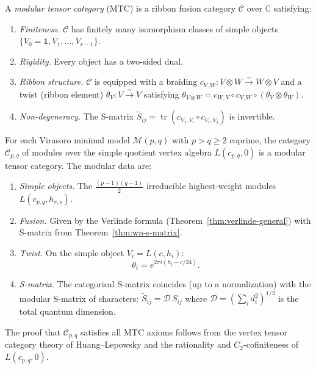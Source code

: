 \begin{definition}\label{def:modular-tensor-category}
A \emph{modular tensor category} (MTC) is a ribbon fusion category $\mathcal{C}$
over $\mathbb{C}$ satisfying:
\begin{enumerate}
\item \emph{Finiteness.}  $\mathcal{C}$ has finitely many isomorphism classes of simple
objects $\{V_0 = \mathbb{1}, V_1, \ldots, V_{r-1}\}$.
\item \emph{Rigidity.}  Every object has a two-sided dual.
\item \emph{Ribbon structure.}  $\mathcal{C}$ is equipped with a braiding
$c_{V,W}\colon V \otimes W \xrightarrow{\sim} W \otimes V$ and a twist
(ribbon element) $\theta_V\colon V \xrightarrow{\sim} V$ satisfying
$\theta_{V \otimes W} = c_{W,V} \circ c_{V,W} \circ (\theta_V \otimes \theta_W)$.
\item \emph{Non-degeneracy.}  The S-matrix $\tilde{S}_{ij} = \operatorname{tr}(c_{V_j,V_i}\circ c_{V_i,V_j})$
is invertible.
\end{enumerate}
\end{definition}

\begin{theorem}\label{thm:minimal-model-mtc}
For each Virasoro minimal model $\mathcal{M}(p,q)$ with $p > q \geq 2$
coprime, the category $\mathcal{C}_{p,q}$ of modules over the
simple quotient vertex algebra $L(c_{p,q}, 0)$ is a modular tensor
category.  The modular data are:
\begin{enumerate}
\item \emph{Simple objects.}  The $\frac{(p-1)(q-1)}{2}$ irreducible highest-weight
modules $L(c_{p,q}, h_{r,s})$.
\item \emph{Fusion.}  Given by the Verlinde formula
(Theorem~\ref{thm:verlinde-general}) with S-matrix from
Theorem~\ref{thm:wn-s-matrix}.
\item \emph{Twist.}  On the simple object $V_i = L(c, h_i)$:
\begin{equation}\label{eq:twist-minimal}
\theta_i = e^{2\pi i(h_i - c/24)}.
\end{equation}
\item \emph{S-matrix.}  The categorical S-matrix coincides (up to a
normalization) with the modular S-matrix of characters:
$\tilde{S}_{ij} = \mathcal{D}\, S_{ij}$ where
$\mathcal{D} = (\sum_i d_i^2)^{1/2}$ is the total quantum dimension.
\end{enumerate}
The proof that $\mathcal{C}_{p,q}$ satisfies all MTC axioms follows from
the vertex tensor category theory of Huang--Lepowsky \cite{HLZ} and
the rationality and $C_2$-cofiniteness of $L(c_{p,q},0)$.
\end{theorem}


